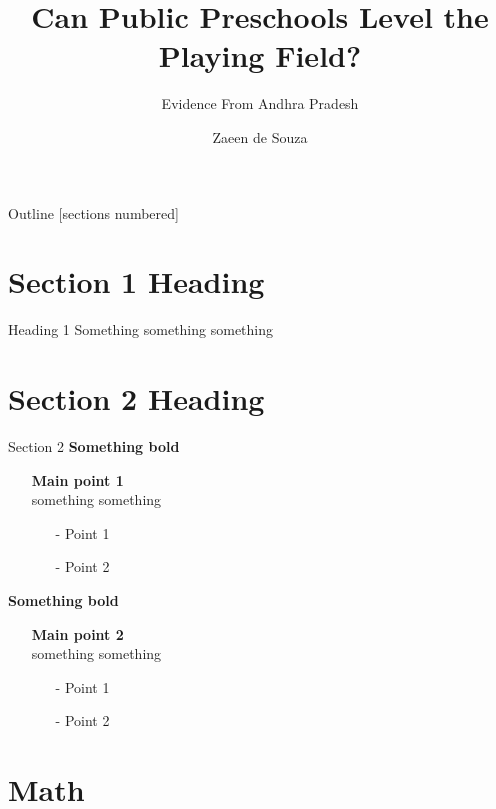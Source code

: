 \documentclass[11pt, aspectratio=169]{beamer} %
\title{\alert{\textbf{Can Public Preschools Level the Playing Field?}}}
\subtitle{Evidence From Andhra Pradesh}
\author{Zaeen de Souza}
\institute{Azim Premji University}
\begin{document}
\maketitle%
	\begin{frame}{Outline}
		\small
		[sections numbered]
		\tableofcontents[hideallsubsections]
	\end{frame}

\section{Section 1 Heading}



\begin{frame}{Heading 1}
Something something something
\end{frame}

\section{Section 2 Heading}

\begin{frame}{Section 2}
		\alert{\textbf{Something bold}}
		\begin{itemize}
			\item[] \textbf{Main point 1} \\
			something something
			\begin{itemize}
				\item[-] Point 1
				\item[-] Point 2
			\end{itemize}
		\end{itemize}
		\alert{\textbf{Something bold}}
		\begin{itemize}
			\item[] \textbf{Main point 2} \\
			something something
			\begin{itemize}
				\item[-] Point 1
				\item[-] Point 2
			\end{itemize}
		\end{itemize}
\end{frame}




\section{Math}
\end{document}
